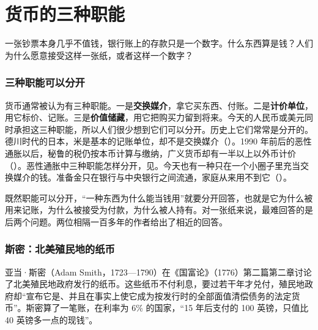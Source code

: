
\section{货币的三种职能}\label{sec:money-functions}

一张钞票本身几乎不值钱，银行账上的存款只是一个数字。什么东西算是钱？人们为什么愿意接受这样一张纸，或者这样一个数字？

\subsubsection{三种职能可以分开}
货币通常被认为有三种职能。一是\textbf{交换媒介}，拿它买东西、付账。二是\textbf{计价单位}，用它标价、记账。三是\textbf{价值储藏}，用它把购买力留到将来。今天的人民币或美元同时承担这三种职能，所以人们很少想到它们可以分开。历史上它们常常是分开的。德川时代的日本，米是基本的记账单位，却不是交换媒介（）。1990 年前后的恶性通胀以后，秘鲁的税仍按本币计算与缴纳，广义货币却有一半以上以外币计价（）。恶性通胀中三种职能怎样分开，见。今天也有一种只在一个小圈子里充当交换媒介的钱。准备金只在银行与中央银行之间流通，家庭从来用不到它（）。

既然职能可以分开，“一种东西为什么能当钱用”就要分开回答，也就是它为什么被用来记账，为什么被接受为付款，为什么被人持有。对一张纸来说，最难回答的是后两个问题。两位相隔一百多年的作者给出了相近的回答。

\subsubsection{斯密：北美殖民地的纸币}
亚当·斯密（Adam Smith，1723—1790）在《国富论》（1776）第二篇第二章讨论了北美殖民地政府发行的纸币。这些纸币不付利息，要过若干年才兑付，殖民地政府却“宣布它是、并且在事实上使它成为按发行时的全部面值清偿债务的法定货币”\cite{smith1776}。斯密算了一笔账，在利率为 6\% 的国家，“15 年后支付的 100 英镑，只值比 40 英镑多一点的现钱”\cite{smith1776}。

